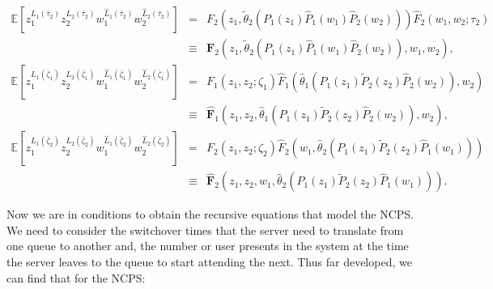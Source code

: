 \documentclass{article}
\newcommand{\esp}{\mathbb{E}}
\begin{document}
\begin{eqnarray*}
\esp\left[z_{1}^{L_{1}\left(\overline{\tau}_{2}\right)}z_{2}^{L_{2}\left(\overline{\tau}_{2}\right)}w_{1}^{\hat{L}_{1}\left(\overline{\tau}_{2}\right)}w_{2}^{\hat{L}_{2}\left(\overline{\tau}_{2}\right)}\right]&=&F_{2}\left(z_{1},\tilde{\theta}_{2}\left(P_{1}\left(z_{1}\right)\hat{P}_{1}\left(w_{1}\right)\hat{P}_{2}\left(w_{2}\right)\right)\right)
\hat{F}_{2}\left(w_{1},w_{2};\tau_{2}\right)\\
&\equiv& \mathbf{F}_{2}\left(z_{1},\tilde{\theta}_{2}\left(P_{1}\left(z_{1}\right)\hat{P}_{1}\left(w_{1}\right)\hat{P}_{2}\left(w_{2}\right)\right),w_{1},w_{2}\right),\\
\esp\left[z_{1}^{L_{1}\left(\overline{\zeta}_{1}\right)}z_{2}^{L_{2}\left(\overline{\zeta}_{1}
\right)}w_{1}^{\hat{L}_{1}\left(\overline{\zeta}_{1}\right)}w_{2}^{\hat{L}_{2}\left(\overline{\zeta}_{1}\right)}\right]
&=&F_{1}\left(z_{1},z_{2};\zeta_{1}\right)\hat{F}_{1}\left(\hat{\theta}_{1}\left(P_{1}\left(z_{1}\right)\tilde{P}_{2}\left(z_{2}\right)\hat{P}_{2}\left(w_{2}\right)\right),w_{2}\right)\\
&\equiv&\hat{\mathbf{F}}_{1}\left(z_{1},z_{2},\hat{\theta}_{1}\left(P_{1}\left(z_{1}\right)\tilde{P}_{2}\left(z_{2}\right)\hat{P}_{2}\left(w_{2}\right)\right),w_{2}\right),\\
\esp\left[z_{1}^{L_{1}\left(\overline{\zeta}_{2}\right)}z_{2}^{L_{2}\left(\overline{\zeta}_{2}\right)}w_{1}^{\hat{L}_{1}\left(\overline{\zeta}_{2}\right)}w_{2}^{\hat{L}_{2}\left(\overline{\zeta}_{2}\right)}\right]
&=&F_{2}\left(z_{1},z_{2};\zeta_{2}\right)\hat{F}_{2}\left(w_{1},\hat{\theta}_{2}\left(P_{1}\left(z_{1}\right)\tilde{P}_{2}\left(z_{2}\right)\hat{P}_{1}\left(w_{1}\right)\right)\right)\\
&\equiv&\hat{\mathbf{F}}_{2}\left(z_{1},z_{2},w_{1},\hat{\theta}_{2}\left(P_{1}\left(z_{1}\right)\tilde{P}_{2}\left(z_{2}\right)\hat{P}_{1}\left(w_{1}\right)\right)\right).
\end{eqnarray*}

Now we are in conditions to obtain the recursive equations that model the NCPS. We need to consider the switchover times that the server need to translate from one queue to another and, the number or user presents in the system at the time the server leaves to the queue to start attending the next. Thus far developed, we can find that for the NCPS:
\end{document}
